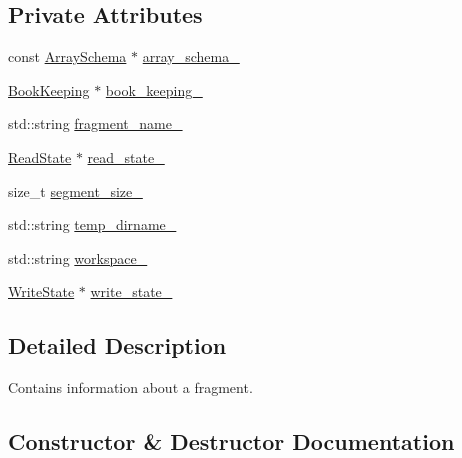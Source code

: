 \subsection*{Private Attributes}
\begin{DoxyCompactItemize}
\item 
const \hyperlink{classArraySchema}{Array\+Schema} $\ast$ \hyperlink{classFragment_a73e5302d11292ae775b0e8b444c6d8ce}{array\+\_\+schema\+\_\+}
\item 
\hyperlink{classBookKeeping}{Book\+Keeping} $\ast$ \hyperlink{classFragment_ac6faae74468b65b3f51f9efa0ee49fb4}{book\+\_\+keeping\+\_\+}
\item 
std\+::string \hyperlink{classFragment_a87cb215f66f4239fc9e78f2b5d6e6c15}{fragment\+\_\+name\+\_\+}
\item 
\hyperlink{classReadState}{Read\+State} $\ast$ \hyperlink{classFragment_a526d3e88d0210c9afbc183b2f62429b0}{read\+\_\+state\+\_\+}
\item 
size\+\_\+t \hyperlink{classFragment_a18f4d5d8f97e867d8b6e54a3c922752e}{segment\+\_\+size\+\_\+}
\item 
std\+::string \hyperlink{classFragment_adc5e894a8229dc1089d455706f188653}{temp\+\_\+dirname\+\_\+}
\item 
std\+::string \hyperlink{classFragment_a8c66b30f81356a716125ddfa6caecb2a}{workspace\+\_\+}
\item 
\hyperlink{classWriteState}{Write\+State} $\ast$ \hyperlink{classFragment_a2dafed41f6f3d9f361ca735d9a38e7e6}{write\+\_\+state\+\_\+}
\end{DoxyCompactItemize}


\subsection{Detailed Description}
Contains information about a fragment. 

\subsection{Constructor \& Destructor Documentation}
\hypertarget{classFragment_aafae2c66e15168f08667e535d89005d9}{}
